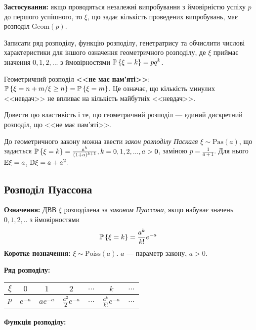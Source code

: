 \noindent\textbf{Застосування:} якщо проводяться незалежні випробування з ймовірністю успіху $p$ до першого успішного,
то $\xi$, що задає кількість проведених випробувань, має розподіл $\mathrm{Geom}(p)$.

\begin{exercise}
    Записати ряд розподілу, функцію розподілу, генетратрису та обчислити
    числові характеристики для іншого означення геометричного розподілу, 
    де $\xi$ приймає значення $0,1,2,...$ з ймовірностями $\P\left\{\xi = k\right\} = pq^k$.
\end{exercise}
Геометричний розподіл \textbf{<<не має пам'яті>>}: $\P\left\{\xi = n+m / \xi \geq n\right\} = \P\left\{\xi = m\right\}$.
Це означає, що кількість минулих <<невдач>> не впливає на кількість майбутніх <<невдач>>.
\begin{exercise}
    Довести цю властивість і те, що геометричний розподіл --- 
    єдиний дискретний розподіл, що <<не має пам'яті>>.
\end{exercise}
До геометричного закону можна звести \emph{закон розподілу Паскаля} $\xi \sim \mathrm{Pas}(a)$,
що задається $\P\left\{\xi = k\right\} = \frac{a^k}{(1+a)^{k+1}}, k = 0,1,2,..., a>0$,
заміною $p=\frac{1}{a+1}$. Для нього $\E\xi = a$, $\D\xi = a + a^2$.

\subsection{Розподіл Пуассона}
\noindent\textbf{Означення:}
    ДВВ $\xi$ розподілена за \emph{законом Пуассона}, 
    якщо набуває значень $0,1,2,..$ з ймовірностями \begin{equation}
        \P\left\{\xi = k\right\} = \frac{a^k}{k!}e^{-a}
    \end{equation}
    \textbf{Коротке позначення:} $\xi \sim \mathrm{Poiss}(a)$.
    $a$ --- параметр закону, $a > 0$.

\noindent\textbf{Ряд розподілу:}

\begin{tabular}{|c|c|c|c|c|c|c|}
    \hline
    $\xi$ & $0$ & $1$ & $2$ & $...$ & $k$ & $...$ \\
    \hline
    $p$ & $e^{-a}$ & $ae^{-a}$ & $\frac{a^2}{2}e^{-a}$ & $...$ & $\frac{a^k}{k!}e^{-a}$ & $...$\\
    \hline
\end{tabular}

\noindent\textbf{Функція розподілу:}

